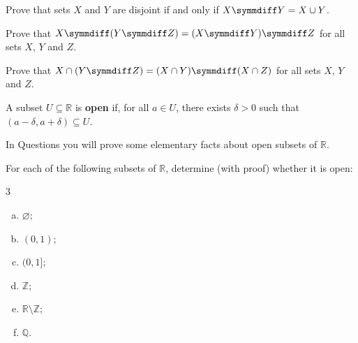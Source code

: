 \begin{chapex}
Prove that sets $X$ and $Y$ are disjoint if and only if $X \symmdiff Y = X \cup Y$.
\end{chapex}

\begin{chapex}
Prove that $X \symmdiff (Y \symmdiff Z) = (X \symmdiff Y) \symmdiff Z$ for all sets $X$, $Y$ and $Z$.
\end{chapex}

\begin{chapex}
\label{cqSymmetricDifferenceEnd}
Prove that $X \cap (Y \symmdiff Z) = (X \cap Y) \symmdiff (X \cap Z)$ for all sets $X$, $Y$ and $Z$.
\end{chapex}

\begin{definition}
\label{defOpenSubsetOfR}
A subset $U \subseteq \mathbb{R}$ is \textbf{open} if, for all $a \in U$, there exists $\delta > 0$ such that $(a-\delta, a+\delta) \subseteq U$.
\end{definition}

In Questions  you will prove some elementary facts about open subsets of $\mathbb{R}$.

\begin{chapex}
\label{cqOpenSubsetsOfRBegin}
For each of the following subsets of $\mathbb{R}$, determine (with proof) whether it is open:
\begin{multicols}{3}
\begin{enumerate}[(a)]
\item $\varnothing$;
\item $(0,1)$;
\item $(0,1]$;
\item $\mathbb{Z}$;
\item $\mathbb{R} \setminus \mathbb{Z}$;
\item $\mathbb{Q}$.
\end{enumerate}
\end{multicols}
\end{chapex}

